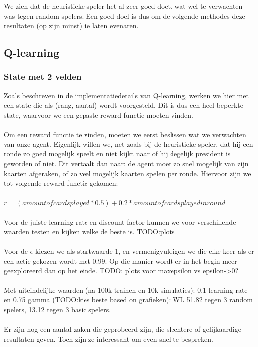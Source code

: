 \documentclass[11pt]{article}
\begin{document}
We zien dat de heuristieke speler het al zeer goed doet, wat wel te verwachten was tegen random spelers. Een goed doel is dus om de volgende methodes deze resultaten (op zijn minst) te laten evenaren.

\subsection{Q-learning}
\subsubsection{State met 2 velden}
Zoals beschreven in de implementatiedetails van Q-learning, werken we hier met een state die als (rang, aantal) wordt voorgesteld. Dit is dus een heel beperkte state, waarvoor we een gepaste reward functie moeten vinden.\\\\
Om een reward functie te vinden, moeten we eerst beslissen wat we verwachten van onze agent. Eigenlijk willen we, net zoals bij de heuristieke speler, dat hij een ronde zo goed mogelijk speelt en niet kijkt naar of hij degelijk president is geworden of niet. Dit vertaalt dan naar: de agent moet zo snel mogelijk van zijn kaarten afgeraken, of zo veel mogelijk kaarten spelen per ronde. Hiervoor zijn we tot volgende reward functie gekomen:\\\\
\(r = (amount of cards played * 0.5) + 0.2 * amount of cards played in round\)\\\\
Voor de juiste learning rate en discount factor kunnen we voor verschillende waarden testen en kijken welke de beste is. TODO:plots\\\\
Voor de \(\epsilon\) kiezen we als startwaarde 1, en vermenigvuldigen we die elke keer als er een actie gekozen wordt met 0.99. Op die manier wordt er in het begin meer geexploreerd dan op het einde. TODO: plots voor maxepsilon vs epsilon->0?\\\\
Met uiteindelijke waarden (na 100k trainen en 10k simulaties): 0.1 learning rate en 0.75 gamma (TODO:kies beste based on grafieken): WL 51.82 tegen 3 random spelers, 13.12 tegen 3 basic spelers. \\\\
Er zijn nog een aantal zaken die geprobeerd zijn, die slechtere of gelijkaardige resultaten geven. Toch zijn ze interessant om even snel te bespreken.
\end{document}
